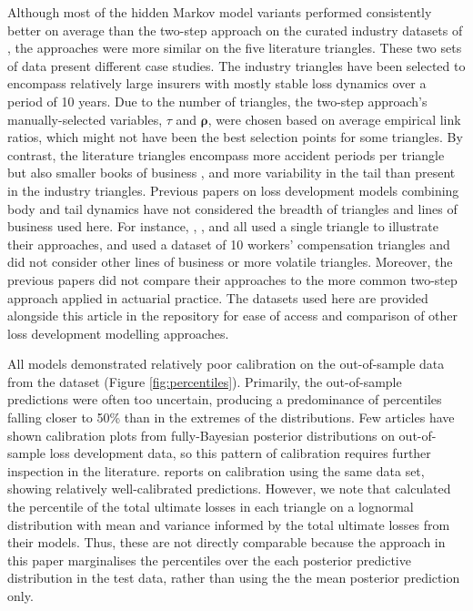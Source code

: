 Although most of the hidden Markov model variants
performed consistently better on average
than the two-step
approach on the curated industry datasets
of \cite{meyers2015}, the approaches were
more similar on the five literature triangles.
These two sets of data present different
case studies. The industry triangles
have been selected to encompass relatively
large insurers with mostly stable
loss dynamics \citep[see][appendix A]{meyers2015}
over a period of 10 years.
Due to the number of triangles, the two-step
approach's manually-selected variables,
$\tau$ and $\bm{\rho}$,
were chosen based on average empirical link
ratios, which might not have been the best
selection points for some triangles.
By contrast, the literature triangles encompass
more accident periods per triangle but also smaller
books of business \citep[e.g. the medium-sized
triangles from][]{balona2022}, and
more variability in the tail than 
present in the industry triangles.
Previous papers on loss development models
combining body and tail dynamics
have not considered the breadth of triangles
and lines of business used here. For instance,
\cite{englandverrall2001}, \cite{verrall2012},
and \cite{verrall2015} all
used a single triangle to illustrate their approaches,
and 
\cite{zhang2012} used a dataset of
10 workers' compensation triangles and
did not consider other lines of business or
more volatile triangles. Moreover,
the previous papers did not compare
their approaches to the more common
two-step approach applied in actuarial
practice.
The datasets used here are provided alongside
this article in the repository
for ease of access
and comparison of other loss development
modelling approaches.

All models demonstrated relatively poor
calibration on the out-of-sample
data from the \cite{meyers2015}
dataset (Figure \ref{fig:percentiles}). 
Primarily, 
the out-of-sample
predictions were often too
uncertain, producing a
predominance of percentiles falling
closer to 50\% than in the extremes
of the distributions.
Few articles have shown calibration
plots from fully-Bayesian posterior
distributions on out-of-sample
loss development data, so this pattern of calibration requires
further inspection in the literature.
\cite{meyers2015} reports on 
calibration using the same data set,
showing relatively well-calibrated
predictions. However, we note
that \cite{meyers2015} calculated
the percentile of the total ultimate
losses in each triangle on a lognormal
distribution with mean and variance
informed by the total ultimate losses
from their models. Thus, these
are not directly comparable because
the approach in this paper marginalises the percentiles
over the each posterior predictive distribution
in the test data, rather than using the
the mean posterior prediction only.

